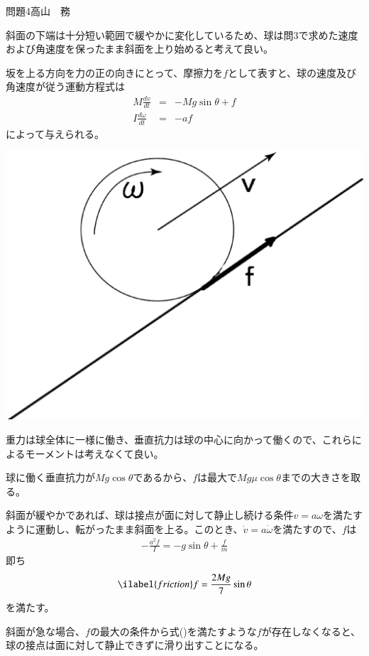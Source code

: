 \documentclass[fleqn]{jbook}
\begin{document}
\begin{answer}{問題4}{高山　務}
\begin{enumerate}
\begin{minipage}{.7\linewidth}
斜面の下端は十分短い範囲で緩やかに変化しているため、球は問3で求めた速度および角速度を保ったまま斜面を上り始めると考えて良い。

坂を上る方向を力の正の向きにとって、摩擦力を$f$として表すと、球の速度及び角速度が従う運動方程式は
\begin{eqnarray}
M\frac{dv}{dt} &=& -Mg\sin\theta + f \\
I\frac{d\omega}{dt} &=& - af 
\end{eqnarray}
によって与えられる。
\end{minipage}
\begin{minipage}{.3\linewidth}
\includegraphics[width=\linewidth]{2002phy4a2.eps}
\end{minipage}

重力は球全体に一様に働き、垂直抗力は球の中心に向かって働くので、これらによるモーメントは考えなくて良い。

球に働く垂直抗力が$Mg\cos\theta$であるから、$f$は最大で$Mg\mu\cos\theta$までの大きさを取る。

斜面が緩やかであれば、球は接点が面に対して静止し続ける条件$v=a\omega$を満たすように運動し、転がったまま斜面を上る。このとき、$\dot{v}=a\dot{\omega}$を満たすので、$f$は
\begin{eqnarray}
- \frac{a^2 f}{I} = -g\sin\theta+\frac{f}{m} \nonumber
\end{eqnarray}
即ち
\begin{eqnarray}
\ilabel{friction}
f=\frac{2Mg}{7}\sin\theta
\end{eqnarray}
を満たす。

斜面が急な場合、$f$の最大の条件から式()を満たすような$f$が存在しなくなると、球の接点は面に対して静止できずに滑り出すことになる。


\end{enumerate}
\end{answer}
\end{document}
